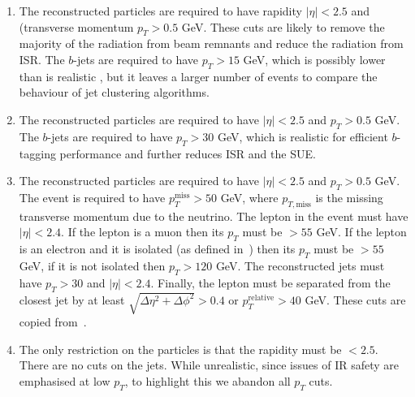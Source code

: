     \begin{enumerate}
        \item The reconstructed particles are required to have
            rapidity \(|\eta|< 2.5\) and (transverse momentum \(p_T > 0.5\) GeV.
            These cuts are likely to remove the majority of the radiation from beam remnants
            and reduce the radiation from ISR.
            The $b$-jets are required to have \(p_T > 15\) GeV, which is possibly lower than is realistic \cite{Chakraborty:2020vwj},
            but it leaves a larger number of events to compare the behaviour of jet clustering algorithms.

        \item  The reconstructed particles are required to have
             \(|\eta|< 2.5\) and \(p_T > 0.5\) GeV.
            The $b$-jets are required to have \(p_T > 30\) GeV, which is realistic for efficient $b$-tagging performance and further reduces ISR and the SUE.
            
        \item The reconstructed particles are required to have
             \(|\eta|< 2.5\) and \(p_T > 0.5\) GeV.
            The event is required to have  \(p_{T}^{\text{miss}} > 50\) GeV,
            where \(p_{T, \text{miss}}\) is the missing transverse momentum due to 
            the neutrino.
            The lepton in the event must have  \(|\eta|< 2.4\).
            If the lepton  is a muon then its \(p_T\) must be \(>  55\) GeV.
            If the lepton  is an electron and it is isolated (as defined in~\cite{Sirunyan_2018}) then its \(p_T\) must be \(> 55\) GeV, if it is not isolated then \(p_T > 120\) GeV.
            The reconstructed jets must have \(p_T > 30\) and \(|\eta|< 2.4\).
            Finally, the lepton must be separated from the closest jet by at least
            \(\sqrt{\Delta\eta^2 + \Delta \phi^2} > 0.4\) or
            \(p_{T}^{\text{relative}} > 40\) GeV.
            These cuts are copied from~\cite{Sirunyan_2020}.
        \item The only restriction on the particles is that the rapidity must be \(< 2.5\).
            There are no cuts on the jets. While unrealistic, since 
            issues of IR safety are emphasised at low \(p_T\),  to highlight this we abandon all \(p_T\) cuts.

    \end{enumerate}


